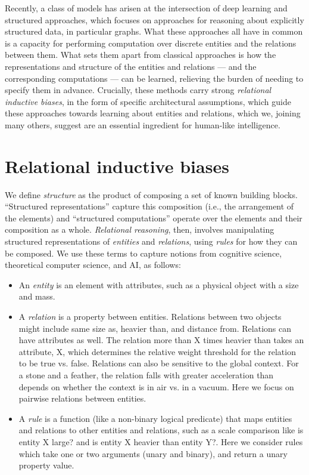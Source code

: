 \documentclass[10pt]{book}
\let\defaultmarginpar\marginpar
\renewcommand\marginpar[2][]{\defaultmarginpar{\itshape\color{gray}#2}}
\begin{document}
Recently, a class of models has arisen at the intersection of deep learning and structured approaches, which focuses on approaches for reasoning about explicitly structured data, in particular graphs. What these approaches all have in common is a capacity for performing computation over discrete entities and the relations between them. What sets them apart from classical approaches is how the representations and structure of the entities and relations --- and the corresponding computations --- can be learned, relieving the burden of needing to specify them in advance. Crucially, these methods carry strong \emph{relational inductive biases}, in the form of specific architectural assumptions, which guide these approaches towards learning about entities and relations, which we, joining many others, suggest are an essential ingredient for human-like intelligence.

\section{Relational inductive biases}

We define \emph{structure} as the product of composing a set of known building blocks. ``Structured representations'' capture this composition (i.e., the arrangement of the elements) and ``structured computations'' operate over the elements and their composition as a whole. \emph{Relational reasoning}\marginpar{relational reasoning}, then, involves manipulating structured representations of \emph{entities} and \emph{relations}, using \emph{rules} for how they can be composed. We use these terms to capture notions from cognitive science, theoretical computer science, and AI, as follows:
\begin{itemize}
    \item An \emph{entity}\marginpar{entity} is an element with attributes, such as a physical object with a size and mass.
    \item A \emph{relation}\marginpar{relation} is a property between entities. Relations between two objects might include same size as, heavier than, and distance from. Relations can have attributes as well. The relation more than X times heavier than takes an attribute, X, which determines the relative weight threshold for the relation to be true vs. false. Relations can also be sensitive to the global context. For a stone and a feather, the relation falls with greater acceleration than depends on whether the context is in air vs. in a vacuum. Here we focus on pairwise relations between entities.
    \item A \emph{rule}\marginpar{rule} is a function (like a non-binary logical predicate) that maps entities and relations to other entities and relations, such as a scale comparison like is entity X large? and is entity X heavier than entity Y?. Here we consider rules which take one or two arguments (unary and binary), and return a unary property value.
\end{itemize}
\end{document}
